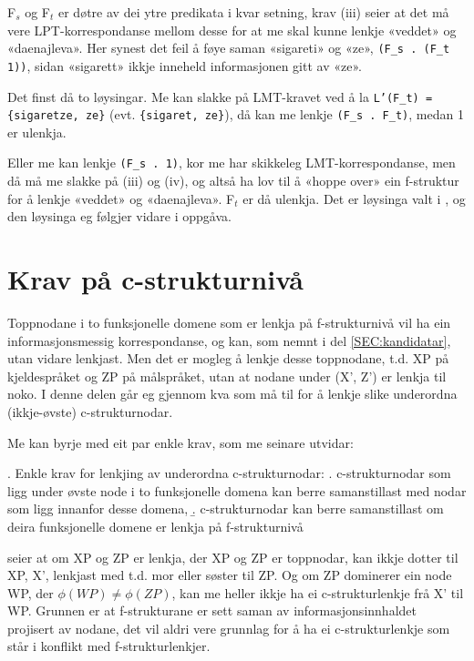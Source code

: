 \documentclass[11pt,a4paper,oneside,draft]{book}
\begin{document}
F$_s$ og F$_t$ er døtre av dei ytre predikata i kvar setning, krav (iii)
seier at det må vere LPT-korrespondanse mellom desse for at me skal
kunne lenkje «veddet» og «daenajleva».  Her synest det feil å føye
saman «sigareti» og «ze», \texttt{(F\_s . (F\_t 1))}, sidan «sigarett» ikkje
inneheld informasjonen gitt av «ze».

Det finst då to løysingar. Me kan slakke på LMT-kravet ved å la
\texttt{L'(F\_t) = \{sigaretze, ze\}} (evt. \texttt{\{sigaret, ze\}}), då kan me lenkje
\texttt{(F\_s . F\_t)}, medan 1 er ulenkja.

Eller me kan lenkje \texttt{(F\_s . 1)}, kor me har skikkeleg
LMT-korrespondanse, men då må me slakke på (iii) og (iv), og altså ha
lov til å «hoppe over» ein f-struktur for å lenkje «veddet» og
«daenajleva». F$_t$ er då ulenkja. Det er løysinga valt i
\citet[s.~75,~fotnote~3]{dyvik2009lmp}, og den løysinga eg følgjer
vidare i oppgåva.

\section{Krav på c-strukturnivå}
\label{sec-3.7}

\label{SEC:subnode}

Toppnodane i to funksjonelle domene som er lenkja på f-strukturnivå
vil ha ein informasjonsmessig korrespondanse, og kan, som nemnt i del
\ref{SEC:kandidatar}, utan vidare lenkjast. Men det er mogleg å lenkje
desse toppnodane, t.d. XP på kjeldespråket og ZP på målspråket, utan
at nodane under (X', Z') er lenkja til noko. I denne delen går eg
gjennom kva som må til for å lenkje slike underordna (ikkje-øvste)
c-strukturnodar.

Me kan byrje med eit par enkle krav, som me seinare utvidar:

\ex. Enkle krav for lenkjing av underordna c-strukturnodar:
\a. \label{subnodekrav-innan-domene} c-strukturnodar som ligg under øvste node i to funksjonelle
    domena kan berre samanstillast med nodar som ligg innanfor desse
    domena,
\b. \label{subnodekrav-f-lenkja} c-strukturnodar kan berre samanstillast om deira funksjonelle
    domene er lenkja på f-strukturnivå

\Last[a] seier at om XP og ZP er lenkja, der XP og ZP er toppnodar,
kan ikkje dotter til XP, X', lenkjast med t.d. mor eller søster til
ZP. Og om ZP dominerer ein node WP, der $\phi(WP) \neq \phi(ZP)$, kan
me heller ikkje ha ei c-strukturlenkje frå X' til WP. Grunnen er at
f-strukturane er sett saman av informasjonsinnhaldet projisert av
nodane, det vil aldri vere grunnlag for å ha ei c-strukturlenkje som
står i konflikt med f-strukturlenkjer.
\end{document}
